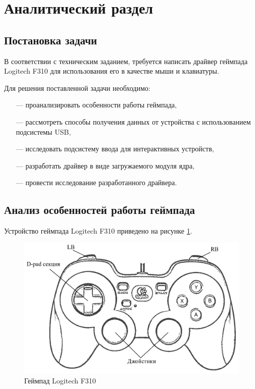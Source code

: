 \section{Аналитический раздел}

\subsection{Постановка задачи}

В соответствии с техническим заданием, требуется написать драйвер геймпада Logitech F310 для использования его в качестве мыши и клавиатуры.

Для решения поставленной задачи необходимо:

\begin{itemize}[leftmargin=1.6\parindent]
    \item[---] проанализировать особенности работы геймпада,
    \item[---] рассмотреть способы получения данных от устройства с использованием подсистемы USB,
    \item[---] исследовать подсистему ввода для интерактивных устройств,
    \item[---] разработать драйвер в виде загружаемого модуля ядра,
    \item[---] провести исследование разработанного драйвера.
\end{itemize}

\subsection{Анализ особенностей работы геймпада}

Устройство геймпада Logitech F310 приведено на рисунке \ref{fig:gamepad}.

\begin{figure}[ht]
    \centering
    \includegraphics[width=0.9\linewidth]{img/gamepad.pdf}
    \caption{Геймпад Logitech F310}
    \label{fig:gamepad}
\end{figure}

